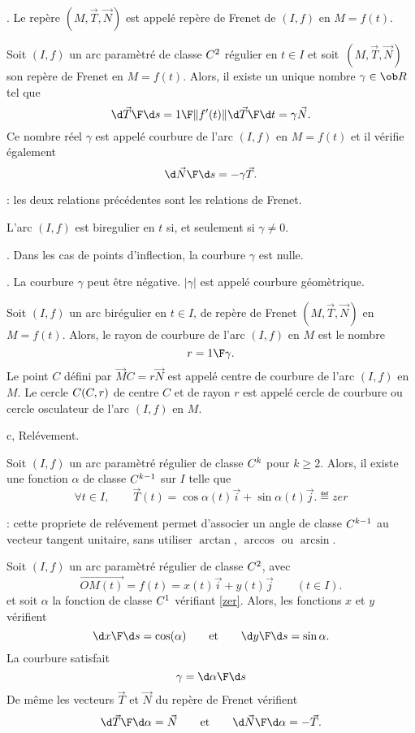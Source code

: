 \Remarque. Le repère $(M,\vec T, \vec N)$ est appelé repère de Frenet de $(I,f)$ en $M=f(t)$. 
\bigskip

\Propriete []  Soit $(I,f)$ un arc paramètré de classe $\sc C^2$ régulier en $t\in I$ et soit~$(M,\vec T,\vec N)$ 
son repère de Frenet en $M=f(t)$. Alors, il existe un unique nombre $\gamma\in\ob R$ tel que 
$$
{\d \vec T\F\d s}={1\F\|f'(t)\|}{\d\vec T\F\d t}=\gamma\vec N.
$$
Ce nombre réel $\gamma$ est appelé courbure de l'arc $(I,f)$ en $M=f(t)$ et il vérifie également 
$$
{\d \vec N\F\d s}=-\gamma\vec T.
$$

\Remarque : les deux relations précédentes sont les relations de Frenet. 
%

\Propriete []  L'arc $(I,f)$ est biregulier en $t$ si, et seulement si $\gamma\neq0$. 
\bigskip

. Dans les cas de points d'inflection, la courbure $\gamma$ est nulle. 
\bigskip

. La courbure $\gamma$ peut être négative. $|\gamma|$ est appelé courbure géomètrique. 
\bigskip

\Definition []  Soit $(I,f)$ un arc birégulier en $t\in I$, 
de repère de Frenet $(M,\vec T,\vec N)$ en $M=f(t)$. 
Alors, le rayon de courbure de l'arc $(I,f)$ en $M$ est le nombre 
$$
r={1\F \gamma}.
$$ 
Le point $C$ défini par $\vec MC=r\vec N$ 
est appelé centre de courbure de l'arc $(I,f)$ en $M$. \medskip\noindent
Le cercle $\sc C(C,r)$ de centre $C$ et de rayon $r$ est appelé cercle de courbure 
ou cercle osculateur de l'arc $(I,f)$ en $M$. 
\bigskip

\Section c, Relévement.


\Propriete []  Soit $(I,f)$ un arc paramètré régulier de classe $\sc C^k$ pour $k\ge2$. 
Alors, il existe une fonction $\alpha$ de classe $\sc C^{k-1}$ sur $I$ telle que 
$$
\forall t\in I, \qquad \vec T(t)=\cos\alpha(t)\vec i+\sin\alpha(t)\vec j. \eqdef{zer}
$$

\Remarque : cette propriete de relévement permet d'associer un angle de classe $\sc C^{k-1}$ au vecteur tangent unitaire, 
sans utiliser $\arctan$, $\arccos$ ou $\arcsin$. 
\bigskip


\Propriete []  Soit $(I,f)$ un arc paramètré régulier de classe $\sc C^2$, avec 
$$
\vec{OM(t)}=f(t)=x(t)\vec i+y(t)\vec j\qquad (t\in I). 
$$
et soit $\alpha$ la fonction de classe $\sc C^1$ vérifiant \eqref{zer}. 
Alors, les fonctions $x$ et $y$ vérifient 
$$
{\d x\F\d s}=\cos(\alpha)\qquad \mbox{et}\qquad {\d y\F\d s}=\sin\alpha.
$$ 
La courbure satisfait
$$
\gamma={\d\alpha\F\d s}
$$
De même les vecteurs $\vec T$ et $\vec N$ du repère de Frenet vérifient
$$
{\d\vec T\F\d\alpha}=\vec N\qquad\mbox{et}\qquad{\d\vec N\F\d\alpha}=-\vec T.
$$

